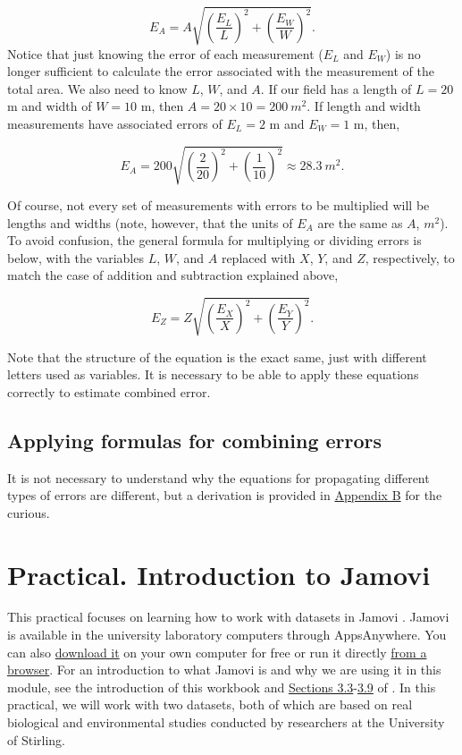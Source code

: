 \documentclass[
]{scrbook}
\begin{document}
\[E_{A} = A \sqrt{\left(\frac{E_{L}}{L} \right)^{2} + \left(\frac{E_{W}}{W} \right)^{2}}.\]
Notice that just knowing the error of each measurement (\(E_{L}\) and \(E_{W}\)) is no longer sufficient to calculate the error associated with the measurement of the total area.
We also need to know \(L\), \(W\), and \(A\).
If our field has a length of \(L = 20\) m and width of \(W = 10\) m, then \(A = 20 \times 10 = 200\:m^{2}\).
If length and width measurements have associated errors of \(E_{L} = 2\) m and \(E_{W} = 1\) m, then,

\[E_{A} = 200 \sqrt{\left(\frac{2}{20} \right)^{2} + \left(\frac{1}{10} \right)^{2}} \approx 28.3\:m^{2}.\]

Of course, not every set of measurements with errors to be multiplied will be lengths and widths (note, however, that the units of \(E_{A}\) are the same as \(A\), \(m^{2}\)).
To avoid confusion, the general formula for multiplying or dividing errors is below, with the variables \(L\), \(W\), and \(A\) replaced with \(X\), \(Y\), and \(Z\), respectively, to match the case of addition and subtraction explained above,

\[E_{Z} = Z \sqrt{\left(\frac{E_{X}}{X} \right)^{2} + \left(\frac{E_{Y}}{Y} \right)^{2}}.\]

Note that the structure of the equation is the exact same, just with different letters used as variables.
It is necessary to be able to apply these equations correctly to estimate combined error.

\hypertarget{applying-formulas-for-combining-errors}{%
\section{Applying formulas for combining errors}\label{applying-formulas-for-combining-errors}}

It is not necessary to understand why the equations for propagating different types of errors are different, but a derivation is provided in \protect\hyperlink{uncertainty_derivation}{Appendix B} for the curious.

\hypertarget{Chapter_8}{%
\chapter{Practical. Introduction to Jamovi}\label{Chapter_8}}

This practical focuses on learning how to work with datasets in Jamovi \citep{Jamovi2022}.
Jamovi is available in the university laboratory computers through AppsAnywhere.
You can also \href{https://www.jamovi.org/download.html}{download it} on your own computer for free or run it directly \href{https://www.jamovi.org/cloud.html}{from a browser}.
For an introduction to what Jamovi is and why we are using it in this module, see the introduction of this workbook and \href{https://davidfoxcroft.github.io/lsj-book/03-Getting-started-with-jamovi.html\#the-spreadsheet}{Sections 3.3}-\href{https://davidfoxcroft.github.io/lsj-book/03-Getting-started-with-jamovi.html\#summary}{3.9} of \citet{Navarro2022}.
In this practical, we will work with two datasets, both of which are based on real biological and environmental studies conducted by researchers at the University of Stirling.
\end{document}
